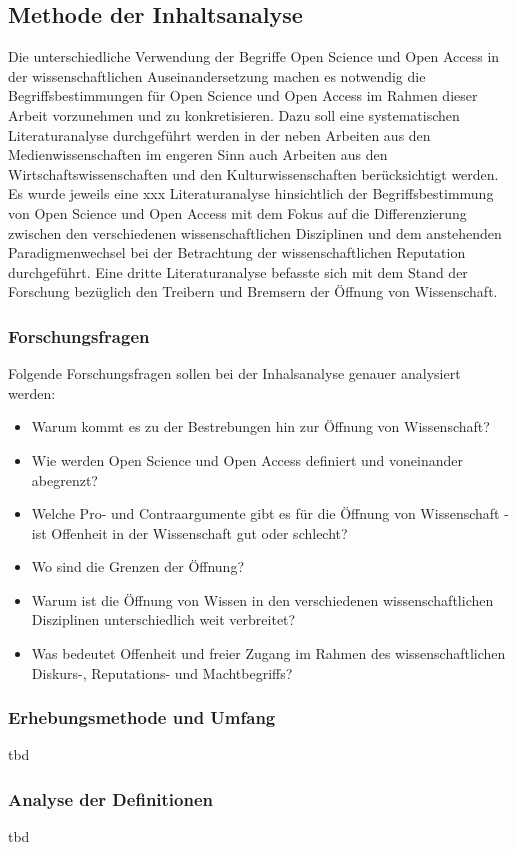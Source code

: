 \subsection{Methode der Inhaltsanalyse}
Die unterschiedliche Verwendung der Begriffe Open Science und Open Access in der wissenschaftlichen Auseinandersetzung machen es notwendig die Begriffsbestimmungen für Open Science und Open Access im Rahmen dieser Arbeit vorzunehmen und zu konkretisieren. Dazu soll eine systematischen Literaturanalyse durchgeführt werden in der neben Arbeiten aus den Medienwissenschaften im engeren Sinn auch Arbeiten aus den Wirtschaftswissenschaften und den Kulturwissenschaften  berücksichtigt werden.
Es wurde jeweils eine xxx Literaturanalyse hinsichtlich der Begriffsbestimmung von Open Science und Open Access mit dem Fokus auf die Differenzierung zwischen den verschiedenen wissenschaftlichen Disziplinen und dem anstehenden Paradigmenwechsel bei der Betrachtung der wissenschaftlichen Reputation durchgeführt. Eine dritte Literaturanalyse befasste sich mit dem Stand der Forschung bezüglich den Treibern und Bremsern der Öffnung von Wissenschaft.
\subsubsection{Forschungsfragen} 
Folgende Forschungsfragen sollen bei der Inhalsanalyse genauer analysiert werden:
\begin{itemize}
\item Warum kommt es zu der Bestrebungen hin zur Öffnung von Wissenschaft? 
\item Wie werden Open Science und Open Access definiert und voneinander abegrenzt? 
\item Welche Pro- und Contraargumente gibt es für die Öffnung von Wissenschaft - ist Offenheit in der Wissenschaft gut oder schlecht? 
\item Wo sind die Grenzen der Öffnung? 
\item Warum ist die Öffnung von Wissen in den verschiedenen wissenschaftlichen Disziplinen unterschiedlich weit verbreitet? 
\item Was bedeutet Offenheit und freier Zugang im Rahmen des wissenschaftlichen Diskurs-, Reputations- und Machtbegriffs?
\end{itemize}	

\subsubsection{Erhebungsmethode und Umfang} 
tbd
\subsubsection{Analyse der Definitionen } 
tbd